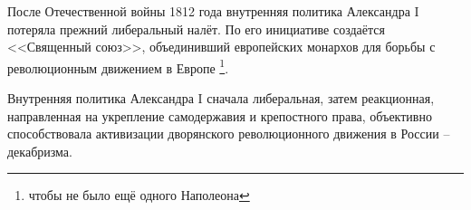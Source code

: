 \documentclass[12pt]{article}
\begin{document}
  После Отечественной войны 1812 года внутренняя политика Александра I потеряла прежний либеральный налёт.
  По его инициативе создаётся <<Священный союз>>, объединивший европейских монархов для борьбы с революционным движением в Европе%
  \footnote{чтобы не было ещё одного Наполеона}.

  Внутренняя политика Александра I сначала либеральная, затем реакционная,
  направленная на укрепление самодержавия и крепостного права,
  объективно способствовала активизации дворянского революционного движения в России -- декабризма.

\end{document}
